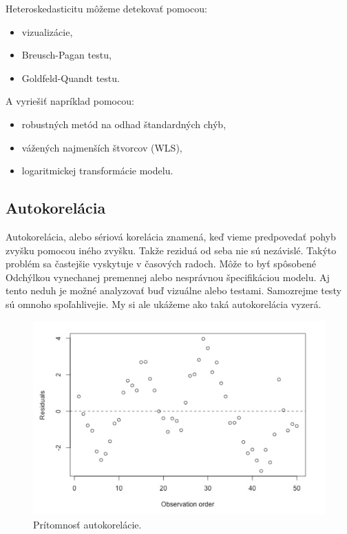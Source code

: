 \newpage

Heteroskedasticitu môžeme detekovať pomocou:

\begin{itemize}
\tightlist
\item
  vizualizácie,
\item
  Breusch-Pagan testu,
\item
  Goldfeld-Quandt testu.
\end{itemize}

A vyriešiť napríklad pomocou:

\begin{itemize}
\tightlist
\item
  robustných metód na odhad štandardných chýb,
\item
  vážených najmenších štvorcov (WLS),
\item
  logaritmickej transformácie modelu.
\end{itemize}

\hypertarget{autokoreluxe1cia}{%
\subsection{Autokorelácia}\label{autokoreluxe1cia}}

Autokorelácia, alebo sériová korelácia znamená, keď vieme predpovedať
pohyb zvyšku pomocou iného zvyšku. Takže reziduá od seba nie sú
nezávislé. Takýto problém sa častejšie vyskytuje v časových radoch. Môže
to byť spôsobené Odchýlkou vynechanej premennej alebo nesprávnou
špecifikáciou modelu. Aj tento neduh je možné analyzovať buď vizuálne
alebo testami. Samozrejme testy sú omnoho spoľahlivejie. My si ale
ukážeme ako taká autokorelácia vyzerá.

\begin{figure}
\begin{center}
\includegraphics{diplomka obrazky/9.png}
\caption{Prítomnosť autokorelácie.}
\end{center}
\end{figure}


